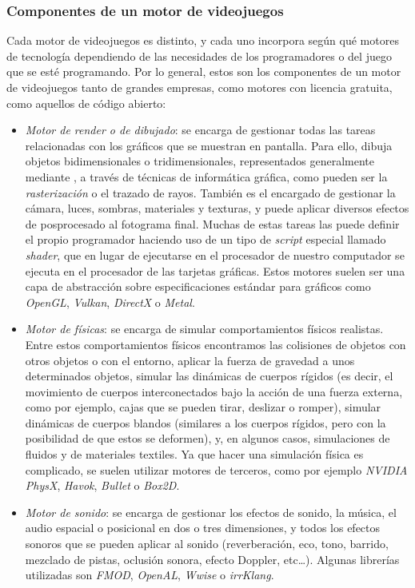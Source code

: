 \subsubsection{Componentes de un motor de videojuegos}
Cada motor de videojuegos es distinto, y cada uno incorpora según qué motores de tecnología dependiendo de las necesidades de los programadores o del juego que se esté programando. Por lo general, estos son los componentes de un motor de videojuegos tanto de grandes empresas, como motores con licencia gratuita, como aquellos de código abierto:
\begin{itemize}
\item \textit{Motor de render o de dibujado}: se encarga de gestionar todas las tareas relacionadas con los gráficos que se muestran en pantalla. Para ello, dibuja objetos bidimensionales o tridimensionales, representados generalmente mediante , a través de técnicas de informática gráfica, como pueden ser la \textit{rasterización} o el trazado de rayos. También es el encargado de gestionar la cámara, luces, sombras, materiales y texturas, y puede aplicar diversos efectos de posprocesado al fotograma final. Muchas de estas tareas las puede definir el propio programador haciendo uso de un tipo de \textit{script} especial llamado \textit{shader}, que en lugar de ejecutarse en el procesador de nuestro computador se ejecuta en el procesador de las tarjetas gráficas. Estos motores suelen ser una capa de abstracción sobre especificaciones estándar para gráficos como \textit{OpenGL}, \textit{Vulkan}, \textit{DirectX} o \textit{Metal}.
\item \textit{Motor de físicas}: se encarga de simular comportamientos físicos realistas. Entre estos comportamientos físicos encontramos las colisiones de objetos con otros objetos o con el entorno, aplicar la fuerza de gravedad a unos determinados objetos, simular las dinámicas de cuerpos rígidos (es decir, el movimiento de cuerpos interconectados bajo la acción de una fuerza externa, como por ejemplo, cajas que se pueden tirar, deslizar o romper), simular dinámicas de cuerpos blandos (similares a los cuerpos rígidos, pero con la posibilidad de que estos se deformen), y, en algunos casos, simulaciones de fluidos y de materiales textiles. Ya que hacer una simulación física es complicado, se suelen utilizar motores de terceros, como por ejemplo \textit{NVIDIA PhysX}, \textit{Havok}, \textit{Bullet} o \textit{Box2D}.
\item \textit{Motor de sonido}: se encarga de gestionar los efectos de sonido, la música, el audio espacial o posicional en dos o tres dimensiones, y todos los efectos sonoros que se pueden aplicar al sonido (reverberación, eco, tono, barrido, mezclado de pistas, oclusión sonora, efecto Doppler, etc\ldots). Algunas librerías utilizadas son \textit{FMOD}, \textit{OpenAL}, \textit{Wwise} o \textit{irrKlang}.

\end{itemize}
